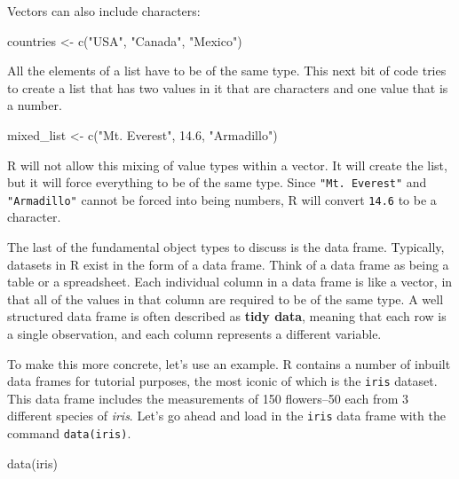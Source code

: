 \documentclass[
  letterpaper,
]{book}
\newenvironment{Shaded}{\begin{snugshade}}{\end{snugshade}}
\newcommand{\FloatTok}[1]{\textcolor[rgb]{0.68,0.00,0.00}{#1}}
\newcommand{\FunctionTok}[1]{\textcolor[rgb]{0.28,0.35,0.67}{#1}}
\newcommand{\NormalTok}[1]{\textcolor[rgb]{0.00,0.23,0.31}{#1}}
\newcommand{\OtherTok}[1]{\textcolor[rgb]{0.00,0.23,0.31}{#1}}
\newcommand{\StringTok}[1]{\textcolor[rgb]{0.13,0.47,0.30}{#1}}
\begin{document}
Vectors can also include characters:

\begin{Shaded}
\begin{Highlighting}[]
\NormalTok{countries }\OtherTok{\textless{}{-}} \FunctionTok{c}\NormalTok{(}\StringTok{"USA"}\NormalTok{, }\StringTok{"Canada"}\NormalTok{, }\StringTok{"Mexico"}\NormalTok{)}
\end{Highlighting}
\end{Shaded}

All the elements of a list have to be of the same type. This next bit of
code tries to create a list that has two values in it that are
characters and one value that is a number.

\begin{Shaded}
\begin{Highlighting}[]
\NormalTok{mixed\_list }\OtherTok{\textless{}{-}} \FunctionTok{c}\NormalTok{(}\StringTok{"Mt. Everest"}\NormalTok{, }\FloatTok{14.6}\NormalTok{, }\StringTok{"Armadillo"}\NormalTok{)}
\end{Highlighting}
\end{Shaded}

R will not allow this mixing of value types within a vector. It will
create the list, but it will force everything to be of the same type.
Since \texttt{"Mt.\ Everest"} and \texttt{"Armadillo"} cannot be forced
into being numbers, R will convert \texttt{14.6} to be a character.

The last of the fundamental object types to discuss is the data frame.
Typically, datasets in R exist in the form of a data frame. Think of a
data frame as being a table or a spreadsheet. Each individual column in
a data frame is like a vector, in that all of the values in that column
are required to be of the same type. A well structured data frame is
often described as \textbf{tidy data}, meaning that each row is a single
observation, and each column represents a different variable.

To make this more concrete, let's use an example. R contains a number of
inbuilt data frames for tutorial purposes, the most iconic of which is
the \texttt{iris} dataset. This data frame includes the measurements of
150 flowers--50 each from 3 different species of \emph{iris}. Let's go
ahead and load in the \texttt{iris} data frame with the command
\texttt{data(iris)}.

\begin{Shaded}
\begin{Highlighting}[]
\FunctionTok{data}\NormalTok{(iris)}
\end{Highlighting}
\end{Shaded}
\end{document}
